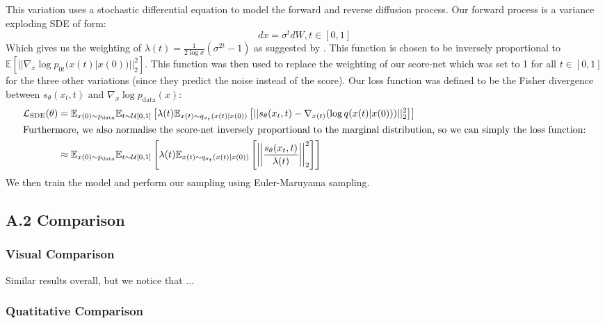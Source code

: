 This variation uses a stochastic differential equation to model the forward and reverse diffusion process. 
Our forward process is a variance exploding SDE of form:
\begin{equation}
  dx = \sigma ^ t dW, t \in [0, 1]
\end{equation}
Which gives us the weighting of
$\lambda(t) = \frac{1}{2 \log \sigma} (\sigma^{2t}-1)$ as suggested by \cite{yang_song}.
This function is chosen to be inversely proportional to $\mathbb{E}[||\nabla_x \log p_{0t}(x(t) | x(0))||^2_2]$.
This function was then used to replace the weighting of our score-net
which was set to 1 for all $t \in [0, 1]$ for the three other variations (since they predict the noise instead of the score).
Our loss function was defined to be the Fisher divergence between $s_\theta(x_t, t)$ and $\nabla_x \log p_{\text{data}}(x)$:
\begin{align}
  \mathcal{L}_\text{SDE}(\theta) &= \mathbb{E}_{x(0) \sim p_\text{data}} \mathbb{E}_{t \sim \mathcal{U}[0, 1]} \left[ 
  \lambda(t) \mathbb{E}_{x(t) \sim q_{\sigma_t}(x(t) | x(0))} \left[
    ||s_\theta (x_t, t) - \nabla_{x(t)} (\log q(x(t) | x(0)))||^2_2
    \right]\right]\\
  \intertext{Furthermore, we also normalise the score-net
  inversely proportional to the marginal distribution, so we can simply the loss function:}
    &\approx \mathbb{E}_{x(0) \sim p_\text{data}} \mathbb{E}_{t \sim \mathcal{U}[0, 1]} \left[ 
  \lambda(t) \mathbb{E}_{x(t) \sim q_{\sigma_t}(x(t) | x(0))} \left[
    \left|\left|\frac{s_\theta(x_t, t)}{\lambda(t)}\right|\right|^2_2
    \right]\right]
\end{align}
We then train the model and perform our sampling using Euler-Maruyama sampling.

\subsection{A.2 Comparison}

\subsubsection{Visual Comparison}



Similar results overall, but we notice that ...




\subsubsection{Quatitative Comparison}
